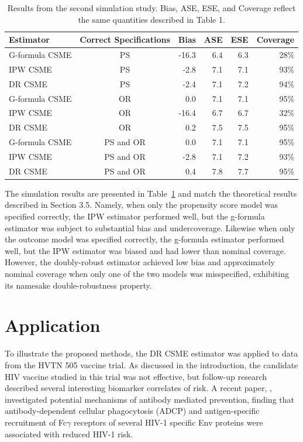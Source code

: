 \documentclass[useAMS,usenatbib,referee]{biom}
\begin{document}
\begin{table}[]
    \centering
    \caption{Results from the second simulation study. Bias, ASE, ESE, and Coverage reflect the same quantities described in Table 1.}
    \begin{tabular}{lcrrrr}
    \hline
         Estimator & Correct Specifications & Bias & ASE & ESE & Coverage \\
         \hline
G-formula CSME & PS & -16.3 & 6.4 & 6.3 & 28\% \\
IPW CSME & PS & -2.8 & 7.1 & 7.1 & 93\% \\
DR CSME & PS & -2.4 & 7.1 & 7.2 & 94\% \\[3pt]
G-formula CSME & OR & 0.0 & 7.1 & 7.1 & 95\% \\
IPW CSME & OR & -16.4 & 6.7 & 6.7 & 32\% \\
DR CSME & OR & 0.2 & 7.5 & 7.5 & 95\% \\[3pt]
G-formula CSME & PS and OR & 0.0 & 7.1 & 7.1 & 95\% \\
IPW CSME & PS and OR & -2.8 & 7.1 & 7.2 & 93\% \\
DR CSME & PS and OR & 0.4 & 7.8 & 7.7 & 95\% \\
         \hline
    \end{tabular}
    \label{tab:two}
\end{table}

The simulation results are presented in Table~\ref{tab:two} and match the theoretical results described in Section 3.5. Namely, when only the propensity score model was specified correctly, the IPW estimator performed well, but the g-formula estimator was subject to substantial bias and undercoverage. Likewise when only the outcome model was specified correctly, the g-formula estimator performed well, but the IPW estimator was biased and had lower than nominal coverage. However, the doubly-robust estimator achieved low bias and approximately nominal coverage when only one of the two models was misspecified, exhibiting its namesake double-robustness property.

\section{Application}

To illustrate the proposed methods, the DR CSME estimator was applied to data from the HVTN 505 vaccine trial. As discussed in the introduction, the candidate HIV vaccine studied in this trial was not effective, but follow-up research described several interesting biomarker correlates of risk. A recent paper, \citet{neidich2019}, investigated potential mechanisms of antibody mediated prevention, finding that antibody-dependent cellular phagocytosis (ADCP) and antigen-specific recruitment of Fc$\gamma$ receptors of several HIV-1 specific Env proteins were associated with reduced HIV-1 risk.
\end{document}
